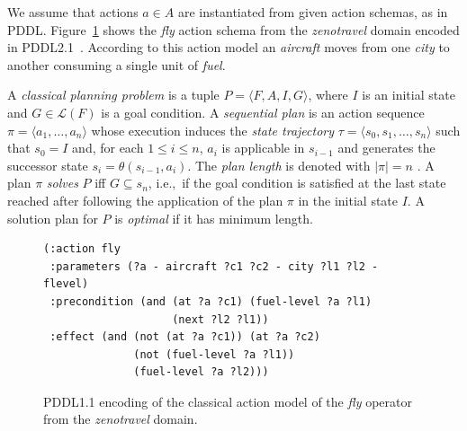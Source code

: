 \documentclass[letterpaper]{article} %
\newcommand{\tup}[1]{{\langle #1 \rangle}}
\begin{document}
We assume that actions $a\in A$ are instantiated from given action schemas, as in PDDL. Figure~\ref{fig:flyc} shows the {\em fly} action schema from the {\em zenotravel} domain encoded in PDDL2.1~\cite{fox2003pddl2}. According to this action model an {\em aircraft} moves from one {\em city} to another consuming a single unit of {\em fuel}.

A {\em classical planning problem} is a tuple $P=\tup{F,A,I,G}$, where $I$ is an initial state and $G\in\mathcal{L}(F)$ is a goal condition. A {\em sequential plan} is an action sequence $\pi=\tup{a_1, \ldots, a_n}$ whose execution induces the {\em state trajectory} $\tau=\tup{s_0, s_1, \ldots, s_n}$ such that $s_0=I$ and, for each {\small $1\leq i\leq n$}, $a_i$ is applicable in $s_{i-1}$ and generates the successor state $s_i=\theta(s_{i-1},a_i)$. The {\em plan length} is denoted with $|\pi|=n$ . A plan $\pi$ {\em solves} $P$ iff $G\subseteq s_n$, i.e.,~if the goal condition is satisfied at the last state reached after following the application of the plan $\pi$ in the initial state $I$. A solution plan for $P$ is {\em optimal} if it has minimum length.

\begin{figure}
	\begin{scriptsize}
		\begin{verbatim}
(:action fly 
 :parameters (?a - aircraft ?c1 ?c2 - city ?l1 ?l2 - flevel)
 :precondition (and (at ?a ?c1) (fuel-level ?a ?l1)
                    (next ?l2 ?l1))
 :effect (and (not (at ?a ?c1)) (at ?a ?c2)
              (not (fuel-level ?a ?l1))
              (fuel-level ?a ?l2)))
		\end{verbatim}
	\end{scriptsize}
	\caption{PDDL1.1 encoding of the classical action model of the {\em fly} operator from the {\em zenotravel} domain.}
	\label{fig:flyc}
\end{figure}
\end{document}
